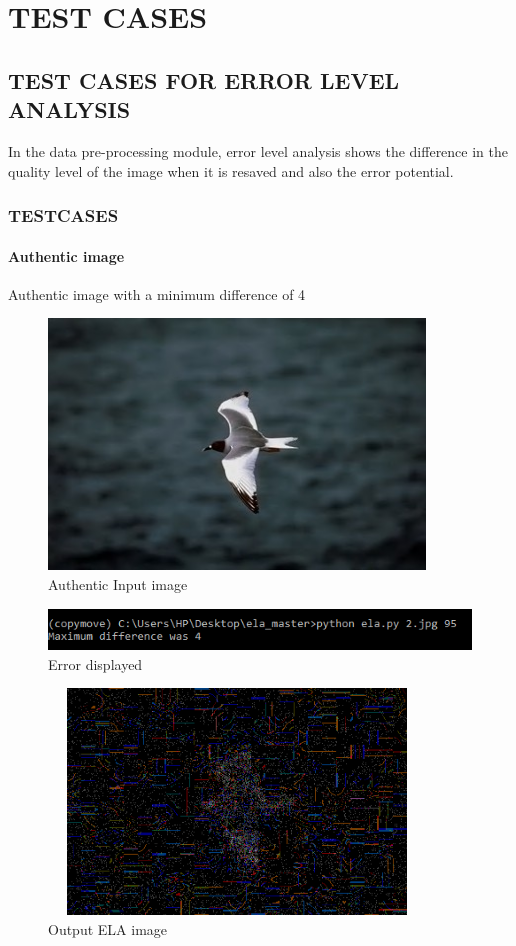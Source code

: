 \chapter{TEST CASES}
\section{TEST CASES FOR ERROR LEVEL ANALYSIS}
In the data pre-processing module, error level analysis shows the difference in the quality level of the image when it is resaved and also the error potential. 
\subsection{TESTCASES}
\subsubsection{Authentic image}
Authentic image with a minimum difference of 4
  \begin{figure}[htp]
\centering
\includegraphics[width=10cm]{Figures/2.jpg}
\caption{Authentic Input image}
\label{fig:lion}
\end{figure}

\begin{figure}[htp]
\centering
\includegraphics[width=15cm]{Figures/as.PNG}
\caption{Error displayed}
\label{fig:lion}
\end{figure}

\begin{figure}[htp]
\centering
\includegraphics[width=10cm,height=6cm]{Figures/2_ela.png}
\caption{Output ELA image}
\label{fig:lion}
\end{figure}


